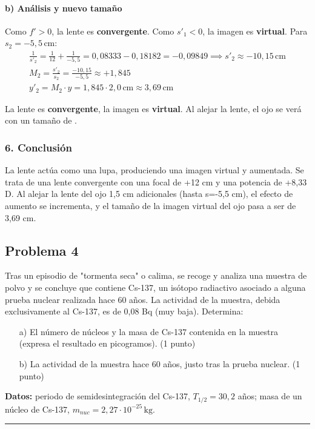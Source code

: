 \paragraph*{b) Análisis y nuevo tamaño}
Como $f'>0$, la lente es \textbf{convergente}. Como $s'_1 < 0$, la imagen es \textbf{virtual}.
Para $s_2 = -5,5 \, \text{cm}$:
\begin{gather}
    \frac{1}{s'_2} = \frac{1}{12} + \frac{1}{-5,5} = 0,08333 - 0,18182 = -0,09849 \implies s'_2 \approx -10,15 \, \text{cm} \\
    M_2 = \frac{s'_2}{s_2} = \frac{-10,15}{-5,5} \approx +1,845 \\
    y'_2 = M_2 \cdot y = 1,845 \cdot 2,0 \, \text{cm} \approx 3,69 \, \text{cm}
\end{gather}
\begin{cajaresultado}
    La lente es \textbf{convergente}, la imagen es \textbf{virtual}. Al alejar la lente, el ojo se verá con un tamaño de .
\end{cajaresultado}

\subsubsection*{6. Conclusión}
\begin{cajaconclusion}
La lente actúa como una lupa, produciendo una imagen virtual y aumentada. Se trata de una lente convergente con una focal de +12 cm y una potencia de +8,33 D. Al alejar la lente del ojo 1,5 cm adicionales (hasta s=-5,5 cm), el efecto de aumento se incrementa, y el tamaño de la imagen virtual del ojo pasa a ser de 3,69 cm.
\end{cajaconclusion}
\newpage
\subsection{Problema 4}
\label{subsec:P4_2021_jul_ext}

\begin{cajaenunciado}
Tras un episodio de "tormenta seca" o calima, se recoge y analiza una muestra de polvo y se concluye que contiene Cs-137, un isótopo radiactivo asociado a alguna prueba nuclear realizada hace 60 años. La actividad de la muestra, debida exclusivamente al Cs-137, es de 0,08 Bq (muy baja). Determina:
\begin{enumerate}
    \item[a)] El número de núcleos y la masa de Cs-137 contenida en la muestra (expresa el resultado en picogramos). (1 punto)
    \item[b)] La actividad de la muestra hace 60 años, justo tras la prueba nuclear. (1 punto)
\end{enumerate}
\textbf{Datos:} periodo de semidesintegración del Cs-137, $T_{1/2}=30,2$ años; masa de un núcleo de Cs-137, $m_{nuc}=2,27\cdot10^{-25}\,\text{kg}$.
\end{cajaenunciado}
\hrule

